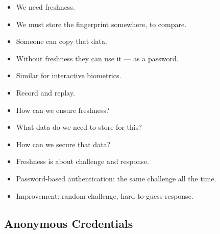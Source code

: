 \begin{frame}
  \begin{remark}
    \begin{itemize}
      \item We need freshness.
      \item We must store the fingerprint somewhere, to compare.
      \item Someone can copy that data.
      \item Without freshness they can use it --- as a password.
    \end{itemize}
  \end{remark}

  \pause{}

  \begin{remark}
    \begin{itemize}
      \item Similar for interactive biometrics.
      \item Record and replay.
    \end{itemize}
  \end{remark}
\end{frame}

\begin{frame}
  \begin{exercise}
    \begin{itemize}
      \item How can we ensure freshness?
      \item What data do we need to store for this?
      \item How can we secure that data?
    \end{itemize}
  \end{exercise}
\end{frame}

\begin{frame}
  \begin{solution}
    \begin{itemize}
      \item Freshness is about challenge and response.
      \item Password-based authentication: the same challenge all the time.
      \item Improvement: random challenge, hard-to-guess response.
    \end{itemize}
  \end{solution}
\end{frame}

\subsection{Anonymous Credentials}

